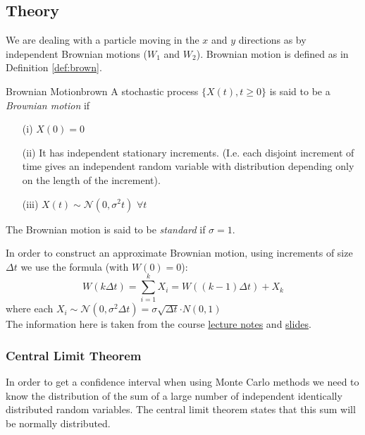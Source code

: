 \subsection{Theory}
\label{sec:theory2}


We are dealing with a particle moving in the $x$ and $y$ directions as by independent Brownian motions ($W_1$ and $W_2$). Brownian motion is defined as in Definition \ref{def:brown}.

\begin{definition}{Brownian Motion}{brown}
A stochastic process $\{ X(t), t \geq 0 \}$ is said to be a \textit{Brownian motion} if
\begin{enumerate}
    \item [(i)] $X(0) = 0$
    \item [(ii)] It has independent stationary increments. (I.e. each disjoint increment of time gives an independent random variable with distribution depending only on the length of the increment). 
    \item [(iii)] $X(t) \sim \mathcal{N}(0, \sigma ^ 2 t)$ $\forall t$ 
\end{enumerate}
The Brownian motion is said to be \textit{standard} if $\sigma = 1$.
\end{definition}

In order to construct an approximate Brownian motion, using increments of size $\Delta t$ we use the formula (with $W(0) = 0$):
$$
W(k\Delta t) = \sum_{i=1}^k X_i = W((k-1)\Delta t) + X_k$$ 
where each $X_i \sim \mathcal{N}(0, \sigma^2\Delta t) = \sigma \sqrt{\Delta t} \mathcal \cdot  {N}(0, 1)$
\\

The information here is taken from the course \href{https://www.canvas.umu.se/courses/6705/files/1572963}{lecture notes} and \href{https://www.canvas.umu.se/courses/6705/files/1679497}{slides}.

\subsubsection{Central Limit Theorem}
\label{sec:clt}

In order to get a confidence interval when using Monte Carlo methods we need to know the distribution of the sum of a large number of independent identically distributed random variables. The central limit theorem states that this sum will be normally distributed.

